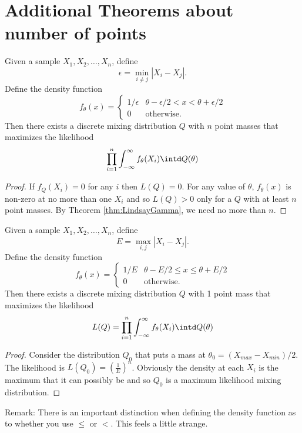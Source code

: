 \section{Additional Theorems about number of points}
	\begin{theorem}
		Given a sample $X_1,X_2,\dots,X_n$, define
		$$\epsilon = \min_{i \neq j}|X_i - X_j|.$$
		Define the density function
		$$f_\theta(x) = \begin{cases}
			1/\epsilon & \theta - \epsilon/2 < x < \theta + \epsilon/2\\
			0 &\text{otherwise.}
		\end{cases}$$
		Then there exists a discrete mixing distribution $Q$ with $n$ point masses that maximizes the likelihood
		$$\prod_{i = 1}^n \int_{-\infty}^{\infty} f_\theta(X_i) \intd Q(\theta)$$
	\end{theorem}
	\begin{proof}
		If $f_Q(X_i) = 0$ for any $i$ then $L(Q) = 0$. For any value of $\theta$, $f_\theta(x)$ is non-zero at no more than one $X_i$ and so $L(Q) > 0$ only for a $Q$ with at least $n$ point masses. By Theorem \ref{thm:LindsayGamma}, we need no more than $n$.
	\end{proof}
	\begin{theorem}
		Given a sample $X_1,X_2,\dots,X_n$, define
		$$E = \max_{i,j}|X_i - X_j|.$$
		Define the density function
		$$f_\theta(x) = \begin{cases}
		1/E & \theta - E/2 \leq x \leq \theta + E/2\\
		0 &\text{otherwise.}
		\end{cases}$$
		Then there exists a discrete mixing distribution $Q$ with 1 point mass that maximizes the likelihood
		$$L(Q) = \prod_{i = 1}^n \int_{-\infty}^{\infty} f_\theta(X_i) \intd Q(\theta)$$
	\end{theorem}
	\begin{proof}
		Consider the distribution $Q_0$ that puts a mass at $\theta_0 = (X_{max} - X_{min})/2$. The likelihood is $L(Q_0) = \left( \frac{1}{E} \right)^n$. Obviously the density at each $X_i$ is the maximum that it can possibly be and so $Q_0$ is a maximum likelihood mixing distribution.
	\end{proof}
	
	Remark: There is an important distinction when defining the density function as to whether you use $\leq$ or $<$. This feels a little strange.
